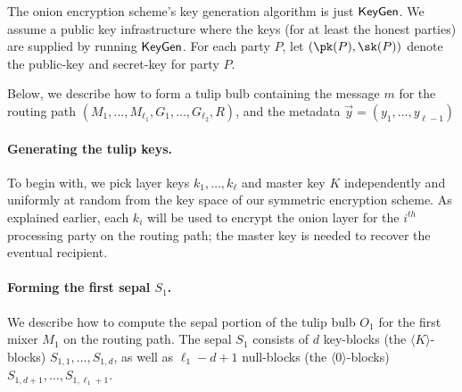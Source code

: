 \documentclass[runningheads,a4paper]{llncs}
\begin{document}
The onion encryption scheme's key generation algorithm is just %
$\mathsf{KeyGen}$. 
We assume a public key infrastructure where the keys (for at least the honest parties) are supplied by running $\mathsf{KeyGen}$. 
For each party $P$, let $(\pk(P), \sk(P))$ denote the public-key and secret-key for party $P$.  

Below, we describe how to form a tulip bulb containing the message $m$ for the routing path $(M_1, \dots, M_{\ell_1}, G_1, \dots, G_{\ell_2}, R)$, and the metadata $\vec{y} = (y_1, \dots, y_{\ell-1})$ 


\paragraph{Generating the tulip keys.}  To begin with, we pick layer keys $k_1, \dots, k_{\ell}$ and master key $K$ independently and uniformly at random from the key space of our symmetric encryption scheme. As explained earlier, each $k_i$ will be used to encrypt the onion layer for the $i^{th}$ processing party on the routing path; the master key is needed to recover the eventual recipient.   


\paragraph{Forming the first sepal $S_1$.}
We describe how to compute the sepal portion of the tulip bulb $O_1$ for the first mixer $M_1$ on the routing path. The sepal $S_{1}$ consists of $d$ key-blocks (the $\langle K\rangle$-blocks) $S_{1, 1}, \dots, S_{1, d}$, as well as $\ell_1-d+1$ null-blocks (the $\langle0\rangle$-blocks) $S_{1, d+1}, \dots, S_{1, \ell_1+1}$. 
\end{document}
